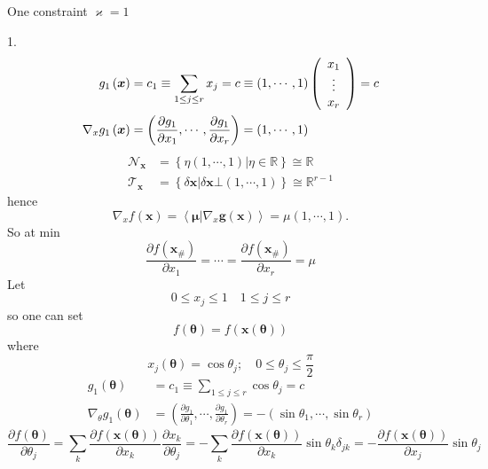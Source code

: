 \documentclass[aps,preprint]{revtex4}%
\begin{document}
One constraint $\varkappa=1$

1.%
\begin{align*}
g_{1}\left(  \boldsymbol{x}\right)   &  =c_{1}\equiv\sum_{1\leq j\leq r}%
x_{j}=c\equiv\left(  1,\cdots,1\right)  \left(
\begin{array}
[c]{c}%
x_{1}\\
\vdots\\
x_{r}%
\end{array}
\right)  =c\\
\nabla_{x}g_{1}\left(  \boldsymbol{x}\right)   &  =\left(  \frac{\partial
g_{1}}{\partial x_{1}},\cdots,\frac{\partial g_{1}}{\partial x_{r}}\right)
=\left(  1,\cdots,1\right)
\end{align*}%
\begin{align*}
\mathcal{N}_{\boldsymbol{x}}  &  =\left\{  \left.  \eta\left(  1,\cdots
,1\right)  \right\vert \eta\in\mathbb{R}\right\}  \cong\mathbb{R}\\
\mathcal{T}_{\boldsymbol{x}}  &  =\left\{  \left.  \delta\boldsymbol{x}%
\right\vert \delta\boldsymbol{x}\bot\left(  1,\cdots,1\right)  \right\}
\cong\mathbb{R}^{r-1}%
\end{align*}
hence%
\[
\nabla_{x}f\left(  \boldsymbol{x}\right)  =\left\langle \boldsymbol{\mu
}\left\vert \nabla_{x}\boldsymbol{g}\left(  \boldsymbol{x}\right)  \right.
\right\rangle =\mu\left(  1,\cdots,1\right)  .
\]
So at min
\[
\frac{\partial f\left(  \boldsymbol{x}_{\#}\right)  }{\partial x_{1}}%
=\cdots=\frac{\partial f\left(  \boldsymbol{x}_{\#}\right)  }{\partial x_{r}%
}=\mu
\]
Let
\[
0\leq x_{j}\leq1\quad1\leq j\leq r
\]
so one can set
\[
f\left(  \boldsymbol{\theta}\right)  =f\left(  \boldsymbol{x}\left(
\boldsymbol{\theta}\right)  \right)
\]
where%
\[
x_{j}\left(  \boldsymbol{\theta}\right)  =\cos\theta_{j};\quad0\leq\theta
_{j}\leq\frac{\pi}{2}%
\]%
\begin{align*}
g_{1}\left(  \boldsymbol{\theta}\right)   &  =c_{1}\equiv\sum_{1\leq j\leq
r}\cos\theta_{j}=c\\
\nabla_{\theta}g_{1}\left(  \boldsymbol{\theta}\right)   &  =\left(
\frac{\partial g_{1}}{\partial\theta_{1}},\cdots,\frac{\partial g_{1}%
}{\partial\theta_{r}}\right)  =-\left(  \sin\theta_{1},\cdots,\sin\theta
_{r}\right)
\end{align*}%
\[
\frac{\partial f\left(  \boldsymbol{\theta}\right)  }{\partial\theta_{j}}%
=\sum_{k}\frac{\partial f\left(  \boldsymbol{x}\left(  \boldsymbol{\theta
}\right)  \right)  }{\partial x_{k}}\frac{\partial x_{k}}{\partial\theta_{j}%
}=-\sum_{k}\frac{\partial f\left(  \boldsymbol{x}\left(  \boldsymbol{\theta
}\right)  \right)  }{\partial x_{k}}\sin\theta_{k}\delta_{jk}=-\frac{\partial
f\left(  \boldsymbol{x}\left(  \boldsymbol{\theta}\right)  \right)  }{\partial
x_{j}}\sin\theta_{j}%
\]%
\end{document}
